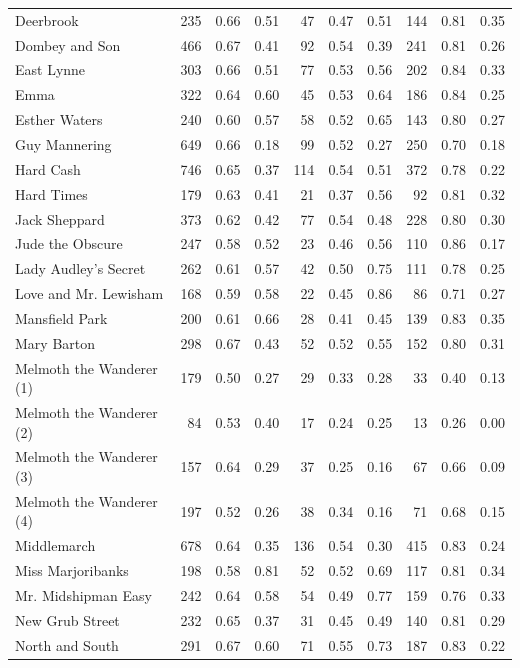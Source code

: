 \begin{longtable}{l|rrr|rrr|rrr}
Deerbrook & 235 & 0.66 & 0.51 & 47 & 0.47 & 0.51 & 144 & 0.81 & 0.35 \\
Dombey and Son & 466 & 0.67 & 0.41 & 92 & 0.54 & 0.39 & 241 & 0.81 & 0.26 \\
East Lynne & 303 & 0.66 & 0.51 & 77 & 0.53 & 0.56 & 202 & 0.84 & 0.33 \\
Emma & 322 & 0.64 & 0.60 & 45 & 0.53 & 0.64 & 186 & 0.84 & 0.25 \\
Esther Waters & 240 & 0.60 & 0.57 & 58 & 0.52 & 0.65 & 143 & 0.80 & 0.27 \\
Guy Mannering & 649 & 0.66 & 0.18 & 99 & 0.52 & 0.27 & 250 & 0.70 & 0.18 \\
Hard Cash & 746 & 0.65 & 0.37 & 114 & 0.54 & 0.51 & 372 & 0.78 & 0.22 \\
Hard Times & 179 & 0.63 & 0.41 & 21 & 0.37 & 0.56 & 92 & 0.81 & 0.32 \\
Jack Sheppard & 373 & 0.62 & 0.42 & 77 & 0.54 & 0.48 & 228 & 0.80 & 0.30 \\
Jude the Obscure & 247 & 0.58 & 0.52 & 23 & 0.46 & 0.56 & 110 & 0.86 & 0.17 \\
Lady Audley's Secret & 262 & 0.61 & 0.57 & 42 & 0.50 & 0.75 & 111 & 0.78 & 0.25 \\
Love and Mr. Lewisham & 168 & 0.59 & 0.58 & 22 & 0.45 & 0.86 & 86 & 0.71 & 0.27 \\
Mansfield Park & 200 & 0.61 & 0.66 & 28 & 0.41 & 0.45 & 139 & 0.83 & 0.35 \\
Mary Barton & 298 & 0.67 & 0.43 & 52 & 0.52 & 0.55 & 152 & 0.80 & 0.31 \\
Melmoth the Wanderer (1) & 179 & 0.50 & 0.27 & 29 & 0.33 & 0.28 & 33 & 0.40 & 0.13 \\
Melmoth the Wanderer (2) & 84 & 0.53 & 0.40 & 17 & 0.24 & 0.25 & 13 & 0.26 & 0.00 \\
Melmoth the Wanderer (3) & 157 & 0.64 & 0.29 & 37 & 0.25 & 0.16 & 67 & 0.66 & 0.09 \\
Melmoth the Wanderer (4) & 197 & 0.52 & 0.26 & 38 & 0.34 & 0.16 & 71 & 0.68 & 0.15 \\
Middlemarch & 678 & 0.64 & 0.35 & 136 & 0.54 & 0.30 & 415 & 0.83 & 0.24 \\
Miss Marjoribanks & 198 & 0.58 & 0.81 & 52 & 0.52 & 0.69 & 117 & 0.81 & 0.34 \\
Mr. Midshipman Easy & 242 & 0.64 & 0.58 & 54 & 0.49 & 0.77 & 159 & 0.76 & 0.33 \\
New Grub Street & 232 & 0.65 & 0.37 & 31 & 0.45 & 0.49 & 140 & 0.81 & 0.29 \\
North and South & 291 & 0.67 & 0.60 & 71 & 0.55 & 0.73 & 187 & 0.83 & 0.22 \\

\end{longtable}
